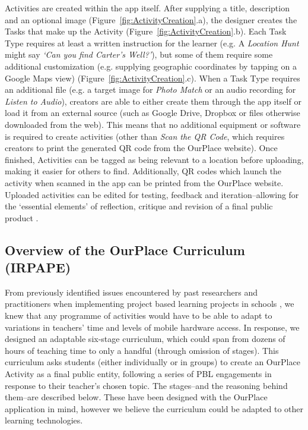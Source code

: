 \documentclass[,hyphens]{sigchi}
\begin{document}
Activities are created within the app itself. After supplying a title, description and an optional image (Figure~\ref{fig:ActivityCreation}.a), the designer creates the Tasks that make up the Activity (Figure~\ref{fig:ActivityCreation}.b). Each Task Type requires at least a written instruction for the learner (e.g. A \textit{Location Hunt} might say \textit{`Can you find Carter's Well?'}), but some of them require some additional customization (e.g. supplying geographic coordinates by tapping on a Google Maps view) (Figure~\ref{fig:ActivityCreation}.c). When a Task Type requires an additional file (e.g. a target image for \textit{Photo Match} or an audio recording for \textit{Listen to Audio}), creators are able to either create them through the app itself or load it from an external source (such as Google Drive, Dropbox or files otherwise downloaded from the web). This means that no additional equipment or software is required to create activities (other than \textit{Scan the QR Code}, which requires creators to print the generated QR code from the OurPlace website). Once finished, Activities can be tagged as being relevant to a location before uploading, making it easier for others to find. Additionally, QR codes which launch the activity when scanned in the app can be printed from the OurPlace website. Uploaded activities can be edited for testing, feedback and iteration--allowing for the `essential elements' of reflection, critique and revision of a final public product \cite{Larmer2015}. 


\subsection{Overview of the OurPlace Curriculum (IRPAPE)}

From previously identified issues encountered by past researchers and practitioners when implementing project based learning projects in schools \cite{Blumenfeld1991, Krajcik2006, InnovationUnit2016, TheEducationEndowmentFoundation2016}, we knew that any programme of activities would have to be able to adapt to variations in teachers' time and levels of mobile hardware access. In response, we designed an adaptable six-stage curriculum, which could span from dozens of hours of teaching time to only a handful (through omission of stages). This curriculum asks students (either individually or in groups) to create an OurPlace Activity as a final public entity, following a series of PBL engagements in response to their teacher's chosen topic. The stages--and the reasoning behind them--are described below. These have been designed with the OurPlace application in mind, however we believe the curriculum could be adapted to other learning technologies.
\end{document}
